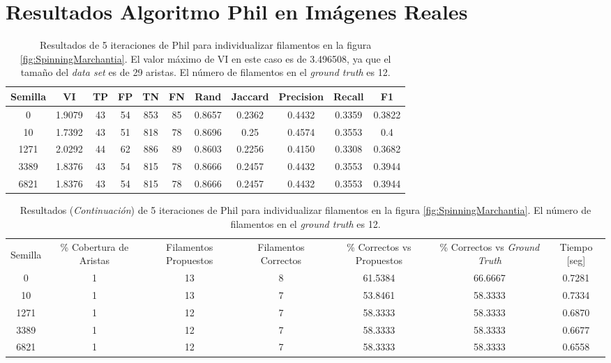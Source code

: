 \section{Resultados Algoritmo Phil en Im\'agenes Reales}

\begin{table}[h]
    \centering
    \begin{tabular}{|c|c|c|c|c|c|c|c|c|c|c|}
    \hline
        Semilla & VI & TP & FP &TN &FN & Rand	& Jaccard &	Precision &	Recall &	F1 \\ \hline 
        0    & 1.9079 & 43 & 54 & 853 & 85 & 0.8657 & 0.2362 & 0.4432 & 0.3359 & 0.3822 \\
        10   & 1.7392 & 43 & 51 & 818 & 78 & 0.8696 & 0.25 & 0.4574 & 0.3553 & 0.4 \\
        1271 & 2.0292 & 44 & 62 & 886 & 89 & 0.8603 & 0.2256 & 0.4150 & 0.3308 & 0.3682 \\
        3389 & 1.8376 & 43 & 54 & 815 & 78 & 0.8666 & 0.2457 & 0.4432 & 0.3553 & 0.3944 \\
        6821 & 1.8376 & 43 & 54 & 815 & 78 & 0.8666 & 0.2457 & 0.4432 & 0.3553 & 0.3944 \\
        \hline
    \end{tabular}
    \caption{Resultados de 5 iteraciones de Phil para individualizar filamentos en la figura \ref{fig:SpinningMarchantia}. El valor m\'aximo de VI en este caso es de 3.496508, ya que el tama\~no del {\it data set} es de 29 aristas. El n\'umero de filamentos en el {\it ground truth} es 12.}
    \label{tab:SpinningMarchantiaDetailedResults1}
\end{table}
\addtocounter{table}{-1}
\begin{table}[h]
    \centering
    \begin{tabular}{|c|c|c|c|c|c|c|}
    \hline
         & \multirow{4}{2cm}{\centering \% Cobertura de Aristas} & \multirow{4}{2cm}{Filamentos Propuestos} & \multirow{4}{2cm}{Filamentos Correctos} & \multirow{4}{2.5cm}{\% Correctos vs Propuestos} & \multirow{4}{2.5cm}{\centering \% Correctos vs {\it Ground Truth}} & \multirow{4}{1.2cm}{\centering Tiempo [seg]} \\
         &  &  &  & & &  \\
        Semilla &  &  &  & & &  \\
        &  &  &  & & &  \\ \hline 
        0 & 1 & 13 & 8 & 61.5384 & 66.6667 & 0.7281  \\
        10 & 1 & 13 & 7 & 53.8461 & 58.3333 & 0.7334\\
        1271 & 1 & 12 & 7 & 58.3333 & 58.3333 & 0.6870\\
        3389 & 1 & 12 & 7 & 58.3333 & 58.3333 & 0.6677\\
        6821 & 1 & 12 & 7 & 58.3333 & 58.3333 & 0.6558\\
        \hline
    \end{tabular}
    \caption{Resultados ({\it Continuaci\'on}) de 5 iteraciones de Phil para individualizar filamentos en la figura \ref{fig:SpinningMarchantia}. El n\'umero de filamentos en el {\it ground truth} es 12.}
\end{table}


